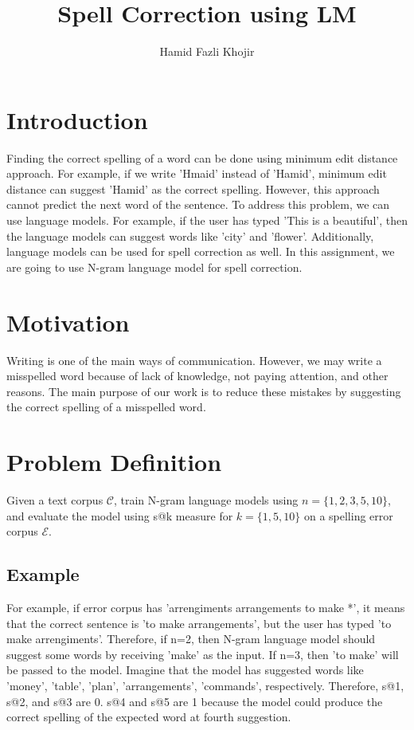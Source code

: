 \documentclass[sigconf]{acmart}
\begin{document}
\title{Spell Correction using LM}
\author{Hamid Fazli Khojir}

\maketitle

\section{Introduction}
Finding the correct spelling of a word can be done using minimum edit distance approach. For example, if we write 'Hmaid' instead of 'Hamid', minimum edit distance can suggest 'Hamid' as the correct spelling. However, this approach cannot predict the next word of the sentence. To address this problem, we can use language models. For example, if the user has typed 'This is a beautiful', then the language models can suggest words like 'city' and 'flower'. Additionally, language models can be used for spell correction as well. In this assignment, we are going to use N-gram language model for spell correction.
\section{Motivation}
Writing is one of the main ways of communication. However, we may write a misspelled word because of lack of knowledge, not paying attention, and other reasons. The main purpose of our work is to reduce these mistakes by suggesting the correct spelling of a misspelled word.
\section{Problem Definition}
Given a text corpus $\mathcal{C}$, train N-gram language models using $n = \{1, 2, 3, 5, 10\}$, and evaluate the model using s@k measure for $k = \{1, 5, 10\}$ on a spelling error corpus $\mathcal{E}$.
\subsection{Example}
For example, if error corpus has 'arrengiments  arrangements  to make *', it means that the correct sentence is 'to make arrangements', but the user has typed 'to make arrengiments'. Therefore, if n=2, then N-gram language model should suggest some words by receiving 'make' as the input. If n=3, then 'to make' will be passed to the model. Imagine that the model has suggested words like 'money', 'table', 'plan', 'arrangements', 'commands', respectively. Therefore, s@1, s@2, and s@3 are 0. s@4 and s@5 are 1 because the model could produce the correct spelling of the expected word at fourth suggestion.
\end{document}

